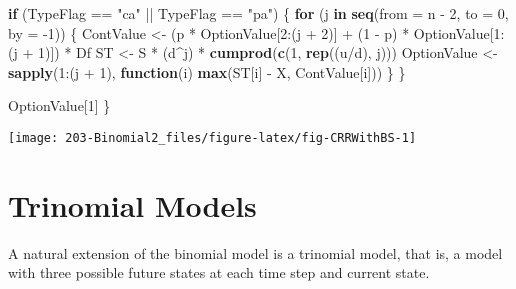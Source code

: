 \documentclass[justified]{tufte-book}
\newenvironment{Shaded}{}{}
\newcommand{\ControlFlowTok}[1]{\textcolor[rgb]{0.00,0.44,0.13}{\textbf{#1}}}
\newcommand{\DataTypeTok}[1]{\textcolor[rgb]{0.56,0.13,0.00}{#1}}
\newcommand{\DecValTok}[1]{\textcolor[rgb]{0.25,0.63,0.44}{#1}}
\newcommand{\KeywordTok}[1]{\textcolor[rgb]{0.00,0.44,0.13}{\textbf{#1}}}
\newcommand{\NormalTok}[1]{#1}
\newcommand{\OperatorTok}[1]{\textcolor[rgb]{0.40,0.40,0.40}{#1}}
\newcommand{\StringTok}[1]{\textcolor[rgb]{0.25,0.44,0.63}{#1}}
\begin{document}
\begin{Shaded}
\begin{Highlighting}[]
    \ControlFlowTok{if}\NormalTok{ (TypeFlag }\OperatorTok{==}\StringTok{ "ca"} \OperatorTok{||}\StringTok{ }\NormalTok{TypeFlag }\OperatorTok{==}\StringTok{ "pa"}\NormalTok{) \{}
        \ControlFlowTok{for}\NormalTok{ (j }\ControlFlowTok{in} \KeywordTok{seq}\NormalTok{(}\DataTypeTok{from =}\NormalTok{ n }\OperatorTok{{-}}\StringTok{ }\DecValTok{2}\NormalTok{, }\DataTypeTok{to =} \DecValTok{0}\NormalTok{, }\DataTypeTok{by =} \DecValTok{{-}1}\NormalTok{)) \{}
\NormalTok{            ContValue \textless{}{-}}\StringTok{ }\NormalTok{(p }\OperatorTok{*}\StringTok{ }\NormalTok{OptionValue[}\DecValTok{2}\OperatorTok{:}\NormalTok{(j }\OperatorTok{+}
\StringTok{                }\DecValTok{2}\NormalTok{)] }\OperatorTok{+}\StringTok{ }\NormalTok{(}\DecValTok{1} \OperatorTok{{-}}\StringTok{ }\NormalTok{p) }\OperatorTok{*}\StringTok{ }\NormalTok{OptionValue[}\DecValTok{1}\OperatorTok{:}\NormalTok{(j }\OperatorTok{+}
\StringTok{                }\DecValTok{1}\NormalTok{)]) }\OperatorTok{*}\StringTok{ }\NormalTok{Df}
\NormalTok{            ST \textless{}{-}}\StringTok{ }\NormalTok{S }\OperatorTok{*}\StringTok{ }\NormalTok{(d}\OperatorTok{\^{}}\NormalTok{j) }\OperatorTok{*}\StringTok{ }\KeywordTok{cumprod}\NormalTok{(}\KeywordTok{c}\NormalTok{(}\DecValTok{1}\NormalTok{, }\KeywordTok{rep}\NormalTok{((u}\OperatorTok{/}\NormalTok{d),}
\NormalTok{                j)))}
\NormalTok{            OptionValue \textless{}{-}}\StringTok{ }\KeywordTok{sapply}\NormalTok{(}\DecValTok{1}\OperatorTok{:}\NormalTok{(j }\OperatorTok{+}\StringTok{ }\DecValTok{1}\NormalTok{), }\ControlFlowTok{function}\NormalTok{(i) }\KeywordTok{max}\NormalTok{(ST[i] }\OperatorTok{{-}}
\StringTok{                }\NormalTok{X, ContValue[i]))}
\NormalTok{        \}}
\NormalTok{    \}}

\NormalTok{    OptionValue[}\DecValTok{1}\NormalTok{]}
\NormalTok{\}}
\end{Highlighting}
\end{Shaded}

\texttt{[image: 203-Binomial2\_files/figure-latex/fig-CRRWithBS-1]}

\hypertarget{sec:trinomial}{%
\chapter{Trinomial Models}\label{sec:trinomial}}

A natural extension of the binomial model is a trinomial model, that is,
a model with three possible future states at each time step and current
state.
\end{document}
